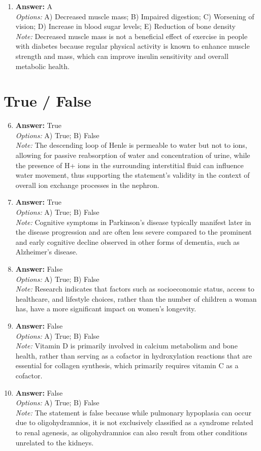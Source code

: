 \documentclass[12pt]{article}
\begin{document}
\begin{enumerate}[label=\arabic*.]
\item \textbf{Answer:} A
\\ \textit{Options:} A) Decreased muscle mass; B) Impaired digestion; C) Worsening of vision; D) Increase in blood sugar levels; E) Reduction of bone density
\\ \textit{Note:} Decreased muscle mass is not a beneficial effect of exercise in people with diabetes because regular physical activity is known to enhance muscle strength and mass, which can improve insulin sensitivity and overall metabolic health.
\end{enumerate}

\section*{True / False}
\begin{enumerate}[label=\arabic*.]
\setcounter{enumi}{5}
\item \textbf{Answer:} True
\\ \textit{Options:} A) True; B) False
\\ \textit{Note:} The descending loop of Henle is permeable to water but not to ions, allowing for passive reabsorption of water and concentration of urine, while the presence of H+ ions in the surrounding interstitial fluid can influence water movement, thus supporting the statement's validity in the context of overall ion exchange processes in the nephron.
\item \textbf{Answer:} True
\\ \textit{Options:} A) True; B) False
\\ \textit{Note:} Cognitive symptoms in Parkinson's disease typically manifest later in the disease progression and are often less severe compared to the prominent and early cognitive decline observed in other forms of dementia, such as Alzheimer's disease.
\item \textbf{Answer:} False
\\ \textit{Options:} A) True; B) False
\\ \textit{Note:} Research indicates that factors such as socioeconomic status, access to healthcare, and lifestyle choices, rather than the number of children a woman has, have a more significant impact on women's longevity.
\item \textbf{Answer:} False
\\ \textit{Options:} A) True; B) False
\\ \textit{Note:} Vitamin D is primarily involved in calcium metabolism and bone health, rather than serving as a cofactor in hydroxylation reactions that are essential for collagen synthesis, which primarily requires vitamin C as a cofactor.
\item \textbf{Answer:} False
\\ \textit{Options:} A) True; B) False
\\ \textit{Note:} The statement is false because while pulmonary hypoplasia can occur due to oligohydramnios, it is not exclusively classified as a syndrome related to renal agenesis, as oligohydramnios can also result from other conditions unrelated to the kidneys.
\end{enumerate}
\end{document}
